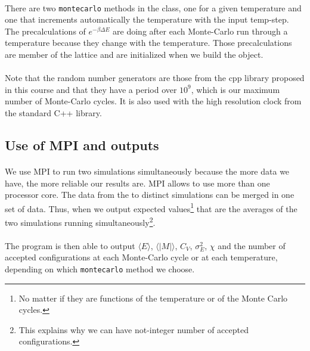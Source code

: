 \documentclass[a4paper, twoside, 11pt]{report}
\theoremstyle{theorem}
\theoremstyle{remark}
\theoremstyle{exemple}
\begin{document}
        \paragraph{}There are two \texttt{montecarlo} methods in the class, one for a given temperature and one that increments automatically the temperature with the input temp-step. The precalculations of ${e}^{-\beta\Delta E}$ are doing after each Monte-Carlo run through a temperature because they change with the temperature. Those precalculations are member of the lattice and are initialized when we build the object.  
        
        \paragraph{}Note that the random number generators are those from the cpp library proposed in this course and that they have a period over ${10}^{9}$, which is our maximum number of Monte-Carlo cycles. It is also used with the high resolution clock from the standard C++ library.
        
        \subsection{Use of MPI and outputs}
        
        	\paragraph{}We use MPI to run two simulations simultaneously because the more data we have, the more reliable our results are. MPI allows to use more than one processor core. The data from the to distinct simulations can be merged in one set of data. Thus, when we output expected values\footnote{No matter if they are functions of the temperature or of the Monte Carlo cycles.} that are the averages of the two simulations running simultaneously\footnote{This explains why we can have not-integer number of accepted configurations.}.
	
			\paragraph{}The program is then able to output $\langle E \rangle$, $\langle |M| \rangle$, $C_V$, $\sigma_E^2$, $\chi$ and the number of accepted configurations at each Monte-Carlo cycle or at each temperature, depending on which \texttt{montecarlo} method we choose.
\end{document}
